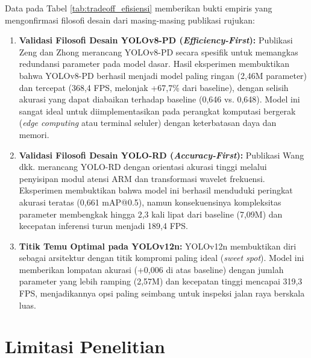 Data pada Tabel \ref{tab:tradeoff_efisiensi} memberikan bukti empiris yang mengonfirmasi filosofi desain dari masing-masing publikasi rujukan:
\begin{enumerate}
	\item \textbf{Validasi Filosofi Desain YOLOv8-PD (\textit{Efficiency-First}):} Publikasi Zeng dan Zhong \cite{Zeng2024} merancang YOLOv8-PD secara spesifik untuk memangkas redundansi parameter pada model dasar. Hasil eksperimen membuktikan bahwa YOLOv8-PD berhasil menjadi model paling ringan (2,46M parameter) dan tercepat (368,4 FPS, melonjak +67,7\% dari baseline), dengan selisih akurasi yang dapat diabaikan terhadap baseline (0,646 vs. 0,648). Model ini sangat ideal untuk diimplementasikan pada perangkat komputasi bergerak (\textit{edge computing} atau terminal seluler) dengan keterbatasan daya dan memori.
	\item \textbf{Validasi Filosofi Desain YOLO-RD (\textit{Accuracy-First}):} Publikasi Wang dkk. \cite{Wang2025} merancang YOLO-RD dengan orientasi akurasi tinggi melalui penyisipan modul atensi ARM dan transformasi wavelet frekuensi. Eksperimen membuktikan bahwa model ini berhasil menduduki peringkat akurasi teratas (0,661 mAP@0.5), namun konsekuensinya kompleksitas parameter membengkak hingga 2,3 kali lipat dari baseline (7,09M) dan kecepatan inferensi turun menjadi 189,4 FPS.
	\item \textbf{Titik Temu Optimal pada YOLOv12n:} YOLOv12n membuktikan diri sebagai arsitektur dengan titik kompromi paling ideal (\textit{sweet spot}). Model ini memberikan lompatan akurasi (+0,006 di atas baseline) dengan jumlah parameter yang lebih ramping (2,57M) dan kecepatan tinggi mencapai 319,3 FPS, menjadikannya opsi paling seimbang untuk inspeksi jalan raya berskala luas.
\end{enumerate}

\section{Limitasi Penelitian}
\label{sec:limitasi_penelitian}

